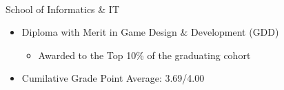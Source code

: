 \documentclass[a4paper,10pt]{article}
\begin{document}
\begin{paracol}{2}
    \begin{rightcolumn}
      \Large\noindent{}
      \vspace{0.15cm}\\
      \normalsize{} \textbar{} School of Informatics \& IT \hfill\small{}
      \begin{itemize}[left=0pt, labelsep=0.5em, itemsep=0pt, topsep=0pt, parsep=0pt, partopsep=0pt]
        \item \lato Diploma with Merit in Game Design \& Development (GDD)
          \begin{itemize}[left=0pt, labelsep=0.5em, itemsep=0pt, topsep=0pt, parsep=0pt, partopsep=0pt]
            \item \lato Awarded to the Top 10\% of the graduating cohort
          \end{itemize}
        \item \lato Cumilative Grade Point Average: 3.69/4.00
      \end{itemize}
            
      \vspace{0.35cm}


\end{rightcolumn}
\end{paracol}
\end{document}
